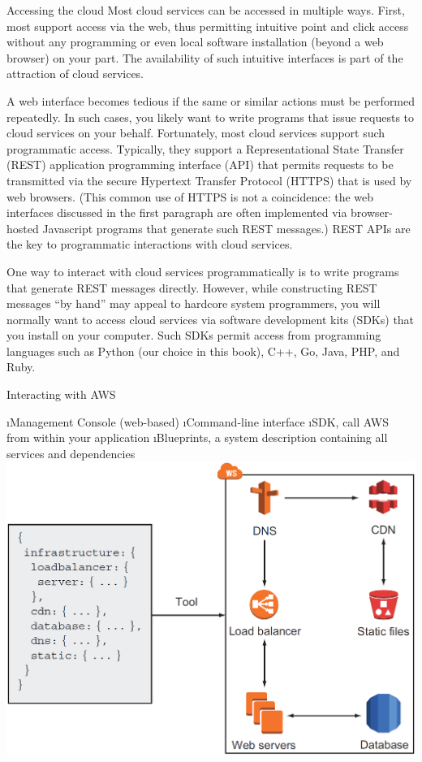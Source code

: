 \begin{frame}[allowframebreaks]{Accessing the cloud}
Most cloud services can be accessed in multiple ways. First, most
support access via the web, thus permitting intuitive point and click
access without any programming or even local software installation
(beyond a web browser) on your part. The availability of such
intuitive interfaces is part of the attraction of cloud services.

A web interface becomes tedious if the same or similar actions
must be performed repeatedly. In such cases, you likely want to
write programs that issue requests to cloud services on your behalf.
Fortunately, most cloud services support such programmatic access.
Typically, they support a Representational State Transfer (REST)
application programming interface (API) that permits requests to be
transmitted via the secure Hypertext Transfer Protocol (HTTPS) that
is used by web browsers. (This common use of HTTPS is not a
coincidence: the web interfaces discussed in the first paragraph are
often implemented via browser-hosted Javascript programs that
generate such REST messages.) REST APIs are the key to
programmatic interactions with cloud services.

One way to interact with cloud services programmatically is to
write programs that generate REST messages directly. However,
while constructing REST messages “by hand” may appeal to hardcore
system programmers, you will normally want to access cloud
services via software development kits (SDKs) that you install on
your computer. Such SDKs permit access from programming
languages such as Python (our choice in this book), C++, Go, Java,
PHP, and Ruby.
\end{frame}


\begin{frame}{Interacting with AWS}

\i Management Console (web-based) 
\i Command-line interface
\i SDK, call AWS from within your application
\i Blueprints, a system description containing all services and dependencies
\includegraphics[width=\textwidth]{imgs/aws_blueprint.PNG}
\end{frame}

